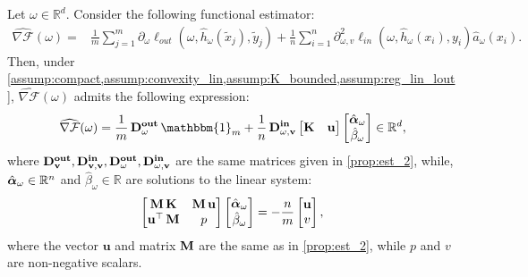\begin{lemma}\label{prop:est_1}
{Let $\omega\in\mathbb{R}^d$.} Consider the following functional estimator:
\begin{align*}
\widehat{\nabla\mathcal{F}}(\omega)=&\frac{1}{m}\sum_{j=1}^m\partial_\omega\ell_{out}(\omega, \hat{h}_\omega(\tilde{x}_j),\tilde{y}_j)+\frac{1}{n}\sum_{i=1}^n\partial_{\omega,v}^2\ell_{in}(\omega, \hat{h}_\omega(x_i),y_i)\hat{a}_\omega(x_i).
\end{align*}
Then, under  \cref{assump:compact,assump:convexity_lin,assump:K_bounded,assump:reg_lin_lout},  $\widehat{\nabla\mathcal{F}}(\omega)$ admits the following expression:
\begin{equation*}
    \widehat{\nabla\mathcal{F}}(\omega)=\frac{1}{m}\Dthree\mathbbm{1}_m+\frac{1}{n}\Dfour
    \begin{bmatrix}
    	\K & \mathbf{u}
    \end{bmatrix}
    \begin{bmatrix}
    	\hat{\alphabf}_\omega\\
    	\hat{\beta}_\omega
    \end{bmatrix}
    \in\mathbb{R}^d,
\end{equation*}
where $\operatorname{\mathbf{D_v^{out}}}, \operatorname{\mathbf{D_{v,v}^{in}}}, \operatorname{\mathbf{D_\omega^{out}}}, \operatorname{\mathbf{D_{\omega,v}^{in}}}$ are the same matrices given in \cref{prop:est_2}, while, $\hat{\operatorname{\boldsymbol{\alpha}}}_\omega\in\mathbb{R}^n$ and $\hat{\beta}_\omega\in\mathbb{R}$ are solutions to the linear system:
\begin{equation}\label{eq:linear_system_adjoint}
\begin{bmatrix}
    \operatorname{\mathbf{M}} \operatorname{\mathbf{K}} & \operatorname{\mathbf{M}} \mathbf{u}\\
    \mathbf{u}^{\top}\operatorname{\mathbf{M}} & p
\end{bmatrix}\begin{bmatrix}
        \hat{\operatorname{\boldsymbol{\alpha}}}_\omega\\
        \hat{\beta}_\omega
    \end{bmatrix}=-\frac{n}{m}\begin{bmatrix}
        \mathbf{u}\\
 	v
    \end{bmatrix},
\end{equation}
where the vector $\mathbf{u}$  and  matrix $\operatorname{\mathbf{M}}$ are the same as in \cref{prop:est_2}, while $p$ and $v$ are non-negative scalars. 

\end{lemma}


